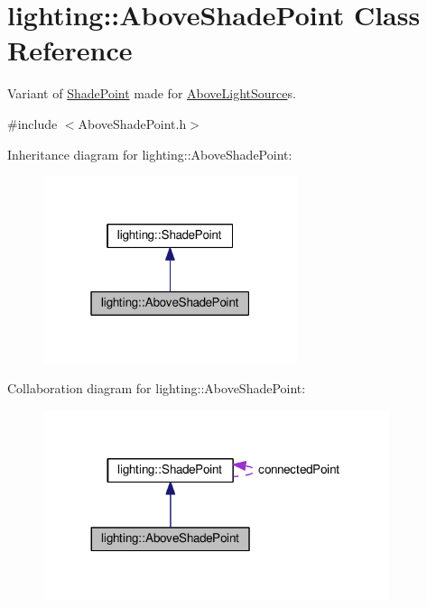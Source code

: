 \hypertarget{classlighting_1_1AboveShadePoint}{}\section{lighting\+:\+:Above\+Shade\+Point Class Reference}
\label{classlighting_1_1AboveShadePoint}


Variant of \hyperlink{classlighting_1_1ShadePoint}{Shade\+Point} made for \hyperlink{classlighting_1_1AboveLightSource}{Above\+Light\+Source}s.  




{\ttfamily \#include $<$Above\+Shade\+Point.\+h$>$}



Inheritance diagram for lighting\+:\+:Above\+Shade\+Point\+:\nopagebreak
\begin{figure}[H]
\begin{center}
\leavevmode
\includegraphics[width=211pt]{classlighting_1_1AboveShadePoint__inherit__graph}
\end{center}
\end{figure}


Collaboration diagram for lighting\+:\+:Above\+Shade\+Point\+:\nopagebreak
\begin{figure}[H]
\begin{center}
\leavevmode
\includegraphics[width=287pt]{classlighting_1_1AboveShadePoint__coll__graph}
\end{center}
\end{figure}
